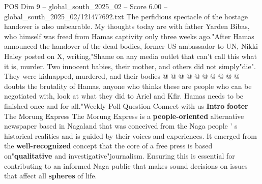 \begin{textsample}{POS Dim 9 – global\_south\_2025\_02 – Score 6.00 – global\_south\_2025\_02/121477692.txt}
The perfidious spectacle of the hostage handover is also unbearable.
My thoughts today are with father Yarden Bibas, who himself was freed from Hamas captivity only three weeks ago."After Hamas announced the handover of the dead bodies, former US ambassador to UN, Nikki Haley posted on X, writing,"Shame on any media outlet that can't call this what it is, murder.
Two innocent babies, their mother, and others did not simply"die".
They were kidnapped, murdered, and their bodies @ @ @ @ @ @ @ @ @ @ doubts the brutality of Hamas, anyone who thinks these are people who can be negotiated with, look at what they did to Ariel and Kfir.
Hamas needs to be finished once and for all."Weekly Poll Question Connect with us \textbf{Intro} \textbf{footer} The Morung Express The Morung Express is a \textbf{people-oriented} alternative newspaper based in Nagaland that was conceived from the Naga people ' s historical realities and is guided by their voices and experiences.
It emerged from the \textbf{well-recognized} concept that the core of a free press is based on"\textbf{qualitative} and investigative"journalism.
Ensuring this is essential for contributing to an informed Naga public that makes sound decisions on issues that affect all \textbf{spheres} of life.

\end{textsample}
